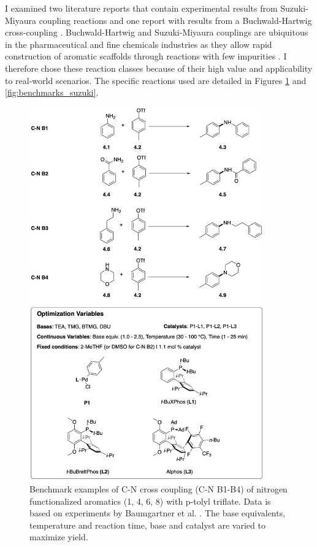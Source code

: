 I examined two literature reports that contain experimental results from Suzuki-Miyaura coupling reactions \cite{Baumgartner2018, Reizman2016b} and one report with results from a Buchwald-Hartwig cross-coupling \cite{Baumgartner2019}. Buchwald-Hartwig and Suzuki-Miyaura couplings are ubiquitous in the pharmaceutical and fine chemicals industries as they allow rapid construction of aromatic scaffolds through reactions with few impurities \cite{Brown2016}. I therefore chose these reaction classes because of their high value and applicability to real-world scenarios. The specific reactions used are detailed in Figures \ref{fig:benchmarks_cn} and \ref{fig:benchmarks_suzuki}.


\begin{figure}
    \centering
    \includegraphics[width=0.9\textwidth]{gfx/Chapter04/c_n_benchmarks_thesis.png}
    \caption{Benchmark examples of C-N cross coupling (C-N B1-B4) of nitrogen functionalized aromatics (1, 4, 6, 8) with p-tolyl triflate. Data is based on experiments by Baumgartner et al. 
 \cite{Baumgartner2019}. The base equivalents, temperature and reaction time, base and catalyst are varied to maximize yield.}
    \label{fig:benchmarks_cn}
\end{figure}

